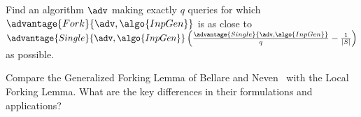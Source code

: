 \begin{exercise}[Optional]
  Find an algorithm $\adv$ making exactly $q$ queries for which $\advantage{Fork}{\adv, \algo{InpGen}}$ is as close to $\advantage{Single}{\adv, \algo{InpGen}} \left( \frac{\advantage{Single}{\adv, \algo{InpGen}}}{q} - \frac{1}{|S|} \right)$ as possible.
\end{exercise}

\begin{exercise}[Optional]
  Compare the Generalized Forking Lemma of Bellare and Neven~\cite{CCS:BelNev06} with the Local Forking Lemma.
  What are the key differences in their formulations and applications?
\end{exercise}

